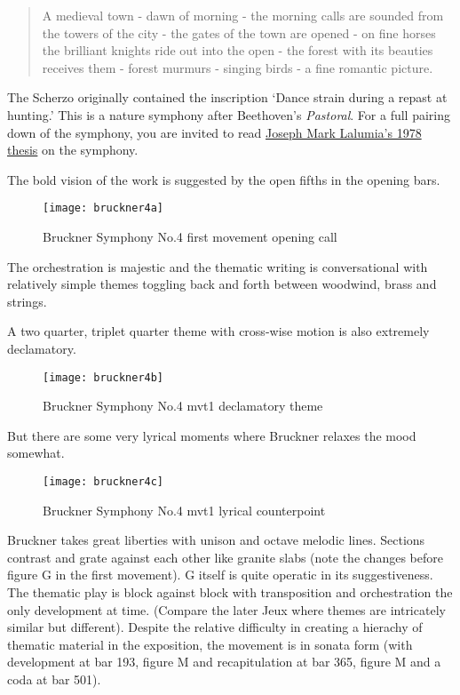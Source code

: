 \begin{quotation}
A medieval town - dawn of morning - the morning calls are sounded from the towers of the city - the gates of the town are opened - on fine horses the brilliant knights ride out into the open - the forest with its beauties receives them - forest murmurs - singing birds - a fine romantic picture. 
\end{quotation}

The Scherzo originally contained the inscription `Dance strain during a repast at hunting.' This is a nature symphony after Beethoven's \textit{Pastoral}. For a full pairing down of the symphony, you are invited to read \href{https://urresearch.rochester.edu/institutionalPublicationPublicView.action?institutionalItemId=5839}{Joseph Mark Lalumia's 1978 thesis} on the symphony. 

The bold vision of the work is suggested by the open fifths in the opening bars. 

\begin{figure}[H]
\centering
\texttt{[image: bruckner4a]}\caption{Bruckner Symphony No.4 first movement opening call}
\label{fig:bruckner1a}
\end{figure}

The orchestration is majestic and the thematic writing is conversational with relatively simple themes toggling back and forth between woodwind, brass and strings. 


A two quarter, triplet quarter theme with cross-wise motion is also extremely declamatory.

\begin{figure}[H]
\centering
\texttt{[image: bruckner4b]}\caption{Bruckner Symphony No.4 mvt1 declamatory theme}
\label{fig:bruckner1b}
\end{figure}

But there are some very lyrical moments where Bruckner relaxes the mood somewhat. 

\begin{figure}[H]
\centering
\texttt{[image: bruckner4c]}\caption{Bruckner Symphony No.4 mvt1 lyrical counterpoint}
\label{fig:bruckner1c}
\end{figure}

Bruckner takes great liberties with unison and octave melodic lines. 
Sections contrast and grate against each other like granite slabs (note the changes before figure G in the first movement). G itself is quite operatic in its suggestiveness. The thematic play is block against block with transposition and orchestration the only development at time. (Compare the later Jeux where themes are intricately similar but different). Despite the relative difficulty in creating a hierachy of thematic material in the exposition, the movement is in sonata form (with development at bar 193, figure M and recapitulation at bar 365, figure M and a coda at bar 501). 

